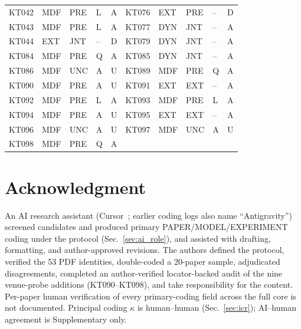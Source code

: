 \documentclass[lettersize,journal]{IEEEtran}
\begin{document}
\begin{table}[t]
\begin{tabular}{@{}lllll@{\hspace{1.4em}}lllll@{}}
KT042 & MDF & PRE & L & A & KT076 & EXT & PRE & -- & D \\
KT043 & MDF & PRE & L & A & KT077 & DYN & JNT & -- & A \\
KT044 & EXT & JNT & -- & D & KT079 & DYN & JNT & -- & A \\
KT084 & MDF & PRE & Q & A & KT085 & DYN & JNT & -- & A \\
KT086 & MDF & UNC & A & U & KT089 & MDF & PRE & Q & A \\
KT090 & MDF & PRE & A & U & KT091 & EXT & EXT & -- & A \\
KT092 & MDF & PRE & L & A & KT093 & MDF & PRE & L & A \\
KT094 & MDF & PRE & A & U & KT095 & EXT & EXT & -- & A \\
KT096 & MDF & UNC & A & U & KT097 & MDF & UNC & A & U \\
KT098 & MDF & PRE & Q & A &  &  &  &  &  \\
\bottomrule
\end{tabular}
\end{table}

\section*{Acknowledgment}
An AI research assistant (Cursor~\cite{Cursor_AI_2026}; earlier coding logs also name ``Antigravity'') screened candidates and produced primary PAPER/MODEL/EXPERIMENT coding under the protocol (Sec.~\ref{sec:ai_role}), and assisted with drafting, formatting, and author-approved revisions. The authors defined the protocol, verified the 53 PDF identities, double-coded a 20-paper sample, adjudicated disagreements, completed an author-verified locator-backed audit of the nine venue-probe additions (KT090--KT098), and take responsibility for the content. Per-paper human verification of every primary-coding field across the full core is not documented. Principal coding $\kappa$ is human--human (Sec.~\ref{sec:icr}); AI--human agreement is Supplementary only.


\end{document}
